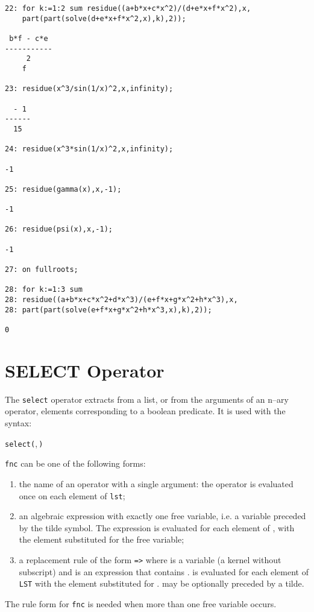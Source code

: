 \begin{small}
\begin{verbatim}
22: for k:=1:2 sum residue((a+b*x+c*x^2)/(d+e*x+f*x^2),x,
    part(part(solve(d+e*x+f*x^2,x),k),2));

 b*f - c*e
-----------
     2
    f

23: residue(x^3/sin(1/x)^2,x,infinity);

  - 1
------
  15

24: residue(x^3*sin(1/x)^2,x,infinity);

-1

25: residue(gamma(x),x,-1);

-1

26: residue(psi(x),x,-1);

-1

27: on fullroots;

28: for k:=1:3 sum
28: residue((a+b*x+c*x^2+d*x^3)/(e+f*x+g*x^2+h*x^3),x,
28: part(part(solve(e+f*x+g*x^2+h*x^3,x),k),2));

0
\end{verbatim}
\end{small}

\section{SELECT Operator}
\hypertarget{operator:SELECT}{}

The \texttt{select} operator extracts from a list,
or from the arguments of an n--ary operator, elements corresponding
to a boolean predicate. It is used with the syntax:
\begin{syntax}
  \texttt{select(},\,\texttt{)}
\end{syntax}

\texttt{fnc} can be one of the following forms:
\begin{enumerate}
\item the name of an operator with a single argument: the operator
is evaluated once on each element of \texttt{lst};
\item an algebraic expression with exactly one free variable, i.e.
a variable preceded by the tilde symbol. The expression
is evaluated for each element of , with the element
substituted for the free variable;
\item a replacement rule of the form  \texttt{=>} 
where  is a variable (a kernel without subscript)
and  is an expression that contains .
 is evaluated for each element of \texttt{LST} with
the element substituted for  .  may be
optionally preceded by a tilde.
\end{enumerate}
The rule form  for \texttt{fnc} is needed when more than
one free variable occurs.

